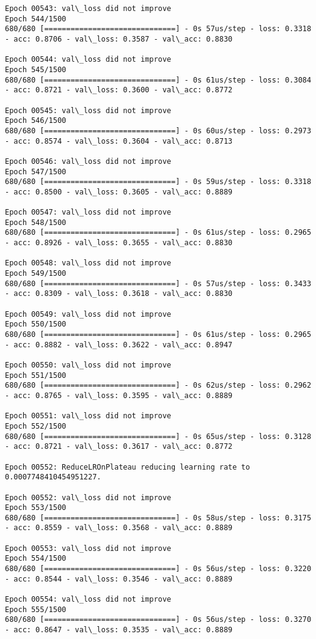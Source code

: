 \documentclass[11pt]{article}
\begin{document}
\begin{Verbatim}[commandchars=\\\{\}]
Epoch 00543: val\_loss did not improve
Epoch 544/1500
680/680 [==============================] - 0s 57us/step - loss: 0.3318 - acc: 0.8706 - val\_loss: 0.3587 - val\_acc: 0.8830

Epoch 00544: val\_loss did not improve
Epoch 545/1500
680/680 [==============================] - 0s 61us/step - loss: 0.3084 - acc: 0.8721 - val\_loss: 0.3600 - val\_acc: 0.8772

Epoch 00545: val\_loss did not improve
Epoch 546/1500
680/680 [==============================] - 0s 60us/step - loss: 0.2973 - acc: 0.8574 - val\_loss: 0.3604 - val\_acc: 0.8713

Epoch 00546: val\_loss did not improve
Epoch 547/1500
680/680 [==============================] - 0s 59us/step - loss: 0.3318 - acc: 0.8500 - val\_loss: 0.3605 - val\_acc: 0.8889

Epoch 00547: val\_loss did not improve
Epoch 548/1500
680/680 [==============================] - 0s 61us/step - loss: 0.2965 - acc: 0.8926 - val\_loss: 0.3655 - val\_acc: 0.8830

Epoch 00548: val\_loss did not improve
Epoch 549/1500
680/680 [==============================] - 0s 57us/step - loss: 0.3433 - acc: 0.8309 - val\_loss: 0.3618 - val\_acc: 0.8830

Epoch 00549: val\_loss did not improve
Epoch 550/1500
680/680 [==============================] - 0s 61us/step - loss: 0.2965 - acc: 0.8882 - val\_loss: 0.3622 - val\_acc: 0.8947

Epoch 00550: val\_loss did not improve
Epoch 551/1500
680/680 [==============================] - 0s 62us/step - loss: 0.2962 - acc: 0.8765 - val\_loss: 0.3595 - val\_acc: 0.8889

Epoch 00551: val\_loss did not improve
Epoch 552/1500
680/680 [==============================] - 0s 65us/step - loss: 0.3128 - acc: 0.8721 - val\_loss: 0.3617 - val\_acc: 0.8772

Epoch 00552: ReduceLROnPlateau reducing learning rate to 0.0007748410454951227.

Epoch 00552: val\_loss did not improve
Epoch 553/1500
680/680 [==============================] - 0s 58us/step - loss: 0.3175 - acc: 0.8559 - val\_loss: 0.3568 - val\_acc: 0.8889

Epoch 00553: val\_loss did not improve
Epoch 554/1500
680/680 [==============================] - 0s 56us/step - loss: 0.3220 - acc: 0.8544 - val\_loss: 0.3546 - val\_acc: 0.8889

Epoch 00554: val\_loss did not improve
Epoch 555/1500
680/680 [==============================] - 0s 56us/step - loss: 0.3270 - acc: 0.8647 - val\_loss: 0.3535 - val\_acc: 0.8889


\end{Verbatim}
\end{document}
